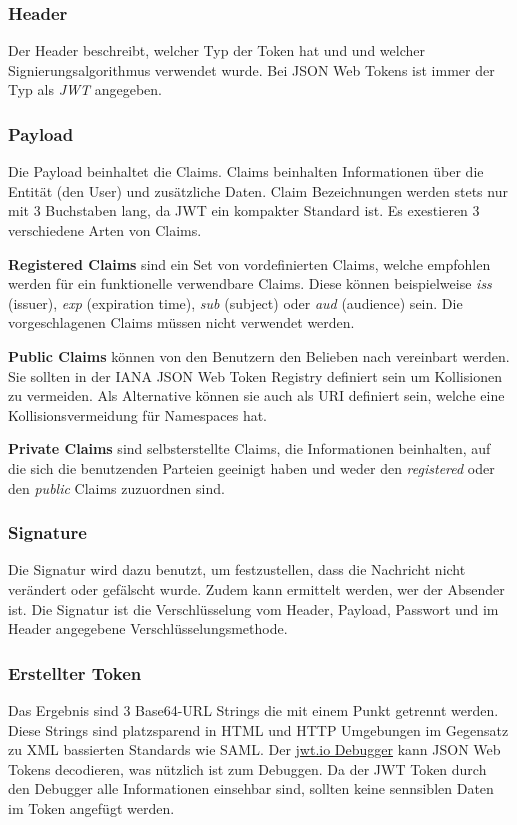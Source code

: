 \subsubsection{Header}
Der Header beschreibt, welcher Typ der Token hat und und welcher Signierungsalgorithmus verwendet wurde. 
Bei JSON Web Tokens ist immer der Typ als \textit{JWT} angegeben.

\subsubsection{Payload}
Die Payload beinhaltet die Claims. Claims beinhalten Informationen über die Entität (den User) und zusätzliche Daten. 
Claim Bezeichnungen werden stets nur mit 3 Buchstaben lang, da JWT ein kompakter Standard ist. Es exestieren 3 verschiedene Arten von Claims. 

\textbf{Registered Claims} sind ein Set von vordefinierten Claims, welche empfohlen werden für ein funktionelle verwendbare Claims. 
Diese können beispielweise \textit{iss} (issuer), \textit{exp} (expiration time), \textit{sub} (subject) oder \textit{aud} (audience) sein. 
Die vorgeschlagenen Claims müssen nicht verwendet werden. 

\textbf{Public Claims} können von den Benutzern den Belieben nach vereinbart werden. Sie sollten in der 
IANA JSON Web Token Registry definiert sein um Kollisionen zu vermeiden. Als Alternative können sie auch als URI definiert sein, welche eine Kollisionsvermeidung für Namespaces hat.

\textbf{Private Claims} sind selbsterstellte Claims, die Informationen beinhalten, auf die sich die benutzenden Parteien geeinigt haben und weder den \textit{registered} 
oder den \textit{public} Claims zuzuordnen sind.

\subsubsection{Signature}
Die Signatur wird dazu benutzt, um festzustellen, dass die Nachricht nicht verändert oder gefälscht wurde. Zudem kann ermittelt werden, wer der Absender ist. 
Die Signatur ist die Verschlüsselung vom Header, Payload, Passwort und im Header angegebene Verschlüsselungsmethode.

\subsubsection{Erstellter Token}
Das Ergebnis sind 3 Base64-URL Strings die mit einem Punkt getrennt werden. Diese Strings sind platzsparend in HTML und HTTP Umgebungen im Gegensatz zu XML bassierten Standards wie SAML. 
Der \href{https://jwt.io/#debugger-io}{jwt.io Debugger} kann JSON Web Tokens decodieren, was nützlich ist zum Debuggen. Da der JWT Token durch den Debugger alle Informationen einsehbar sind, 
sollten keine sennsiblen Daten im Token angefügt werden.

